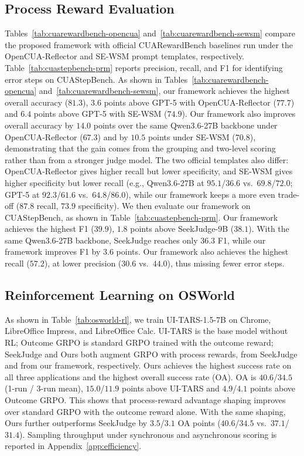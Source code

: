 \subsection{Process Reward Evaluation}
\label{sec:exp-prm}

Tables~\ref{tab:cuarewardbench-opencua} and~\ref{tab:cuarewardbench-sewsm} compare the proposed framework with official CUARewardBench baselines run under the OpenCUA-Reflector and SE-WSM prompt templates, respectively. Table~\ref{tab:cuastepbench-prm} reports precision, recall, and F1 for identifying error steps on CUAStepBench.
As shown in Tables~\ref{tab:cuarewardbench-opencua} and~\ref{tab:cuarewardbench-sewsm}, our framework achieves the highest overall accuracy ($81.3$), $3.6$ points above GPT-5 with OpenCUA-Reflector ($77.7$) and $6.4$ points above GPT-5 with SE-WSM ($74.9$). Our framework also improves overall accuracy by $14.0$ points over the same Qwen3.6-27B backbone under OpenCUA-Reflector ($67.3$) and by $10.5$ points under SE-WSM ($70.8$), demonstrating that the gain comes from the grouping and two-level scoring rather than from a stronger judge model. The two official templates also differ: OpenCUA-Reflector gives higher recall but lower specificity, and SE-WSM gives higher specificity but lower recall (e.g., Qwen3.6-27B at $95.1$/$36.6$ vs.\ $69.8$/$72.0$; GPT-5 at $92.3$/$61.6$ vs.\ $64.8$/$86.0$), while our framework keeps a more even trade-off ($87.8$ recall, $73.9$ specificity).
We then evaluate our framework on CUAStepBench, as shown in Table~\ref{tab:cuastepbench-prm}. Our framework achieves the highest F1 ($39.9$), $1.8$ points above SeekJudge-9B ($38.1$). With the same Qwen3.6-27B backbone, SeekJudge reaches only $36.3$ F1, while our framework improves F1 by $3.6$ points. Our framework also achieves the highest recall ($57.2$), at lower precision ($30.6$ vs.\ $44.0$), thus missing fewer error steps.

\subsection{Reinforcement Learning on OSWorld}
\label{sec:exp-osworld}

As shown in Table~\ref{tab:osworld-rl}, we train UI-TARS-1.5-7B on Chrome, LibreOffice Impress, and LibreOffice Calc. UI-TARS is the base model without RL; Outcome GRPO is standard GRPO trained with the outcome reward; SeekJudge and Ours both augment GRPO with process rewards, from SeekJudge and from our framework, respectively. Ours achieves the highest success rate on all three applications and the highest overall success rate (OA). OA is $40.6$/$34.5$ (1-run / 3-run mean), $15.0$/$11.9$ points above UI-TARS and $4.9$/$4.1$ points above Outcome GRPO. This shows that process-reward advantage shaping improves over standard GRPO with the outcome reward alone. With the same shaping, Ours further outperforms SeekJudge by $3.5$/$3.1$ OA points ($40.6$/$34.5$ vs.\ $37.1$/$31.4$).
Sampling throughput under synchronous and asynchronous scoring is reported in Appendix~\ref{app:efficiency}.


